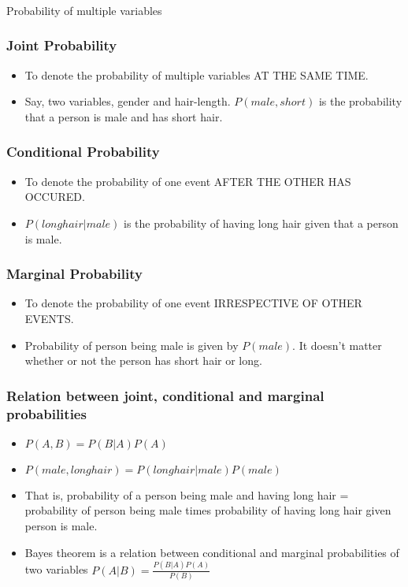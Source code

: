 \begin{frame}[fragile]\frametitle{}
\begin{center}
{\Large Probability of multiple variables}
\end{center}
\end{frame}

\begin{frame}
\frametitle{Joint Probability}
\begin{itemize}
\item  To denote the probability of multiple variables AT THE SAME TIME.
\item Say, two variables, gender and hair-length.  $P(male, short)$ is the probability that a person is male and has short hair.
\end{itemize}
\end{frame}

\begin{frame}
\frametitle{Conditional Probability}
\begin{itemize}
\item  To denote the probability of one event AFTER THE OTHER HAS OCCURED.
\item  $P (long hair | male)$ is the probability of having long hair given that a person is male.
\end{itemize}
\end{frame}

\begin{frame}
\frametitle{Marginal Probability}
\begin{itemize}
\item  To denote the probability of one event IRRESPECTIVE OF OTHER EVENTS.
\item  Probability of person being male is given by $P(male)$. It doesn't matter whether or not the person has short hair or long.
\end{itemize}
\end{frame}

\begin{frame}
\frametitle{Relation between joint, conditional and marginal probabilities}


\begin{itemize}
\item  $P(A,B) = P(B|A)P(A)$
\item $P(male,long hair)=P(long hair|male) P(male)$
\item That is, probability of a person being male and having long hair =
probability of person being male times probability of having long hair
given person is male.
\item Bayes theorem is a relation between conditional and marginal probabilities of two
variables $P(A|B) = \frac{P(B|A)P(A)}{P(B)}$
\end{itemize}
\end{frame}

